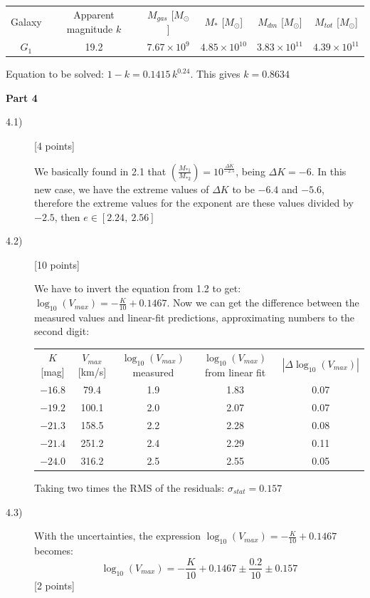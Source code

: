 \begin{center}
\begin{tabular}{cccccc}
Galaxy & Apparent magnitude $k$ & $M_{gas}$ [$M_\odot$]
  & $M_{*}$ [$M_\odot$] & $M_{dm}$ [$M_\odot$] & $M_{tot}$ [$M_\odot$]\\
$G_1$ & 19.2 & $7.67\times 10^{9}$ & $4.85\times 10^{10}$
  & $3.83\times 10^{11}$ & $4.39\times 10^{11}$
\end{tabular}
\end{center}

Equation to be solved: $1 - k = 0.1415\,k^{0.24}$. This gives
$k = 0.8634$

\textbf{Part 4}

\begin{description}
\item[4.1)] \hfill[4 points]

  We basically found in 2.1 that
  $\left(\frac{M_{*1}}{M_{*2}}\right) = 10^{\frac{\Delta K}{-2.5}}$,
  being $\Delta K = -6$. In this new case, we have the extreme values of
  $\Delta K$ to be $-6.4$ and $-5.6$, therefore the extreme values for
  the exponent are these values divided by $-2.5$, then
  $e\in[2.24,\ 2.56]$

\item[4.2)] \hfill[10 points]

  We have to invert the equation from 1.2 to get:
  $\log_{10}(V_{max}) = -\frac{K}{10} + 0.1467$. Now we can get the
  difference between the measured values and linear-fit predictions,
  approximating numbers to the second digit:

  \begin{center}
  \begin{tabular}{ccccc}
  $K$ [mag] & $V_{max}$ [km/s] & $\log_{10}(V_{max})$ measured
    & $\log_{10}(V_{max})$ from linear fit
    & $|\Delta\log_{10}(V_{max})|$\\
  $-16.8$ & 79.4 & 1.9 & 1.83 & 0.07\\
  $-19.2$ & 100.1 & 2.0 & 2.07 & 0.07\\
  $-21.3$ & 158.5 & 2.2 & 2.28 & 0.08\\
  $-21.4$ & 251.2 & 2.4 & 2.29 & 0.11\\
  $-24.0$ & 316.2 & 2.5 & 2.55 & 0.05
  \end{tabular}
  \end{center}

  Taking two times the RMS of the residuals:
  $\sigma_{stat} = 0.157$

\item[4.3)] With the uncertainties, the expression
  $\log_{10}(V_{max}) = -\frac{K}{10} + 0.1467$ becomes:
  \[ \log_{10}(V_{max}) = -\frac{K}{10} + 0.1467\pm\frac{0.2}{10}
     \pm 0.157 \]
  \hfill[2 points]


\end{description}
